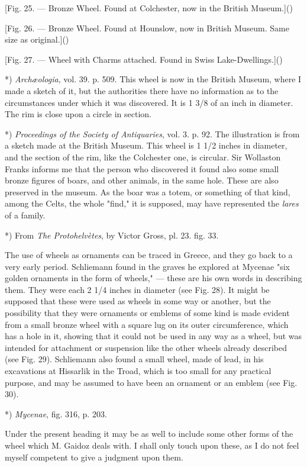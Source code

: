\documentclass[a4paper, 11pt, oneside, polutonikogreek, english]{article}
\begin{document}
[Fig. 25. --- Bronze Wheel. Found at Colchester, now in the British Museum.]()

[Fig. 26. --- Bronze Wheel. Found at Hounslow, now in British Museum. Same size as original.]()

[Fig. 27. --- Wheel with Charms attached. Found in Swiss Lake-Dwellings.]()

*) \emph{Archæologia}, vol. 39. p. 509. This wheel is now in the British Museum, where I made a sketch of it, but the authorities there have no information as to the circumstances under which it was discovered. It is 1 3/8 of an inch in diameter. The rim is close upon a circle in section.

*) \emph{Proceedings of the Society of Antiquaries}, vol. 3. p. 92. The illustration is from a sketch made at the British Museum. This wheel is 1 1/2 inches in diameter, and the section of the rim, like the Colchester one, is circular. Sir Wollaston Franks informs me that the person who discovered it found also some small bronze figures of boars, and other animals, in the same hole. These are also preserved in the museum. As the boar was a totem, or something of that kind, among the Celts, the whole "find," it is supposed, may have represented the \emph{lares} of a family.

*) From \emph{The Protohelvètes}, by Victor Gross, pl. 23. fig. 33.

The use of wheels as ornaments can be traced in Greece, and they go back to a very early period. Schliemann found in the graves he explored at Mycenae "six golden ornaments in the form of wheels," --- these are his own words in describing them. They were each 2 1/4 inches in diameter (see Fig. 28). It might be supposed that these were used as wheels in some way or another, but the possibility that they were ornaments or emblems of some kind is made evident from a small bronze wheel with a square lug on its outer circumference, which has a hole in it, showing that it could not be used in any way as a wheel, but was intended for attachment or suspension like the other wheels already described (see Fig. 29). Schliemann also found a small wheel, made of lead, in his excavations at Hissarlik in the Troad, which is too small for any practical purpose, and may be assumed to have been an ornament or an emblem (see Fig. 30).

*) \emph{Mycenae}, fig. 316, p. 203.

Under the present heading it may be as well to include some other forms of the wheel which M. Gaidoz deals with. I shall only touch upon these, as I do not feel myself competent to give a judgment upon them.
\end{document}
